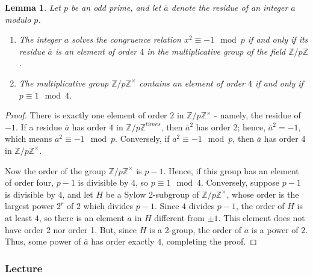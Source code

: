 \documentclass[12pt]{article}
\newtheorem{lem}[thm]{Lemma}  %
\theoremstyle{definition}
\theoremstyle{remark}
\numberwithin{equation}{section}
\newcommand\Z{\mathbb Z}    %
\begin{document}
\begin{lem}
        Let $p$ be an odd prime, and let $\overline{a}$ denote the residue of an integer $a$ modulo $p$. \begin{enumerate}
                \item The integer $a$ solves the congruence relation $x^2 \equiv -1 \mod p$ if and only if its residue $\overline{a}$ is an element of order $4$ in the multiplicative group of the field $\Z/p\Z$.
                \item The multiplicative group $\Z/p\Z^{\times}$ contains an element of order $4$ if and only if $p\equiv 1 \mod 4$.
        \end{enumerate}
\end{lem}
\begin{proof}
        There is exactly one element of order $2$ in $\Z/p\Z^{\times}$ - namely, the residue of $-1$. If a residue $\overline{a}$ has order $4$ in $\Z/p\Z^{times}$, then $\overline{a}^2$ has order 2; hence, $\overline{a}^2 = -1$, which means $a^2 \equiv -1 \mod p$. Conversely, if $a^2 \equiv -1 \mod p$, then $\overline{a}$ has order $4$ in $\Z/p\Z^{\times}$. 


        Now the order of the group $\Z/p\Z^{\times}$ is $p-1$. Hence, if this group has an element of order four, $p-1$ is divisible by $4$, so $p \equiv 1 \mod 4$. Conversely, suppose $p-1$ is divisible by $4$, and let $H$ be a Sylow 2-subgroup of $\Z/p\Z^{\times}$, whose order is the largest power $2^r$ of $2$ which divides $p-1$. Since $4$ divides $p-1$, the order of $H$ is at least $4$, so there is an element $\overline{a}$ in $H$ different from $\pm 1$. This element does not have order 2 nor order 1. But, since $H$ is a 2-group, the order of $\overline{a}$ is a power of $2$. Thus, some power of $\overline{a}$ has order exactly $4$, completing the proof.
\end{proof}



\vspace{15pt}


\subsubsection{Lecture}
\end{document}
